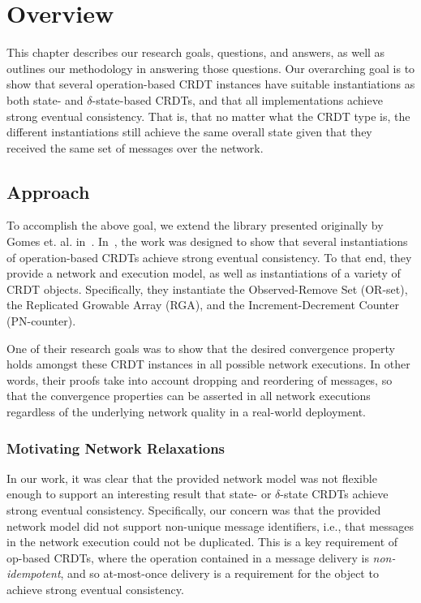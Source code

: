 \chapter{Overview}
This chapter describes our research goals, questions, and answers, as well as
outlines our methodology in answering those questions. Our overarching goal is
to show that several operation-based CRDT instances have suitable instantiations
as both state- and $\delta$-state-based CRDTs, and that all implementations
achieve strong eventual consistency. That is, that no matter what the CRDT type
is, the different instantiations still achieve the same overall state given that
they received the same set of messages over the network.

\section{Approach}
To accomplish the above goal, we extend the library presented originally by
Gomes et. al. in~\citep{gomes17}. In~\citep{gomes17}, the work was designed to
show that several instantiations of operation-based CRDTs achieve strong
eventual consistency. To that end, they provide a network and execution model,
as well as instantiations of a variety of CRDT objects. Specifically, they
instantiate the Observed-Remove Set (OR-set), the Replicated Growable Array
(RGA), and the Increment-Decrement Counter (PN-counter).

One of their research goals was to show that the desired convergence property
holds amongst these CRDT instances in all possible network executions. In other
words, their proofs take into account dropping and reordering of messages, so
that the convergence properties can be asserted in all network executions
regardless of the underlying network quality in a real-world deployment.

\subsection{Motivating Network Relaxations}
In our work, it was clear that the provided network model was not flexible
enough to support an interesting result that state- or $\delta$-state
CRDTs achieve strong eventual consistency. Specifically, our concern was that
the provided network model did not support non-unique message identifiers, i.e.,
that messages in the network execution could not be duplicated. This is a key
requirement of op-based CRDTs, where the operation contained in a message
delivery is \textit{non-idempotent}, and so at-most-once delivery is a
requirement for the object to achieve strong eventual consistency.

